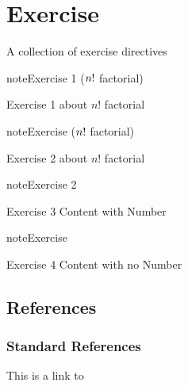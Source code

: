 

\pagestyle{empty}
\sphinxmaketitle
\pagestyle{plain}
\sphinxtableofcontents
\pagestyle{normal}
\label{\detokenize{index::doc}}



\chapter{Exercise}
\label{\detokenize{exercise:exercise}}\label{\detokenize{exercise::doc}}
\sphinxAtStartPar
A collection of exercise directives
 \label{exercise:exercise-1}

\begin{sphinxadmonition}{note}{Exercise 1 (\protect\(n!\protect\) factorial)}



\sphinxAtStartPar
Exercise 1 about \(n!\) factorial
\end{sphinxadmonition}
 \label{exercise:exercise-2}
\begin{sphinxadmonition}{note}{Exercise (\protect\(n!\protect\) factorial)}



\sphinxAtStartPar
Exercise 2 about \(n!\) factorial
\end{sphinxadmonition}
 \label{exercise:exercise-3}

\begin{sphinxadmonition}{note}{Exercise 2}



\sphinxAtStartPar
Exercise 3 Content with Number
\end{sphinxadmonition}
 \label{exercise:exercise-4}
\begin{sphinxadmonition}{note}{Exercise}



\sphinxAtStartPar
Exercise 4 Content with no Number
\end{sphinxadmonition}


\section{References}
\label{\detokenize{exercise:references}}

\subsection{Standard References}
\label{\detokenize{exercise:standard-references}}
\sphinxAtStartPar
This is a link to 

